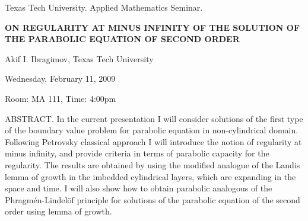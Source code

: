 \documentclass[oneside]{amsart}
\begin{document}
\begin{center}
Texas Tech University.  Applied Mathematics Seminar.

\end{center}

\begin{center}

{\LARGE \uppercase{\textbf{
On regularity at minus infinity of the solution of the parabolic equation of second order
}}}

Akif I. Ibragimov, Texas Tech University

Wednesday, February 11, 2009

Room: MA 111, Time: 4:00pm

\end{center}

ABSTRACT.
In the current presentation I will consider solutions of the first type of the  boundary value problem for parabolic equation in non-cylindrical domain. Following Petrovsky classical approach I will introduce the notion of regularity at minus infinity, and provide criteria in terms of parabolic capacity for the regularity. The results are obtained by using the modified analogue of the Landis lemma of growth in the imbedded cylindrical layers, which are expanding in the space and time.
I will also show how to obtain parabolic analogous of the Phragmén-Lindelöf principle for solutions of the parabolic equation of the second order using lemma of growth.
\end{document}
